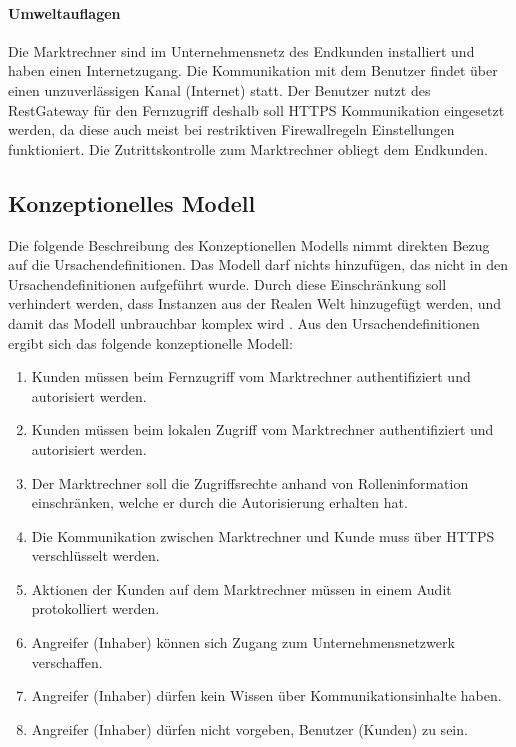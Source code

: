 \documentclass[11pt,a4paper]{report}
\begin{document}
\paragraph{Umweltauflagen} Die Marktrechner sind im Unternehmensnetz des Endkunden installiert und haben einen Internetzugang. Die Kommunikation mit dem Benutzer findet über einen unzuverlässigen Kanal (Internet) statt. Der Benutzer nutzt des RestGateway für den Fernzugriff deshalb soll HTTPS Kommunikation eingesetzt werden, da diese auch meist bei restriktiven Firewallregeln Einstellungen funktioniert. Die Zutrittskontrolle zum Marktrechner obliegt dem Endkunden.

\subsection{Konzeptionelles Modell}

Die folgende Beschreibung des Konzeptionellen Modells nimmt direkten Bezug auf die Ursachendefinitionen. Das Modell darf nichts hinzufügen, das nicht in den Ursachendefinitionen aufgeführt wurde. Durch diese Einschränkung soll verhindert werden, dass Instanzen aus der Realen Welt hinzugefügt werden, und damit das Modell unbrauchbar komplex wird \cite[s.~256]{gutmann}. Aus den Ursachendefinitionen ergibt sich das folgende konzeptionelle Modell:

\begin{enumerate}[leftmargin=*]
\item Kunden müssen beim Fernzugriff vom Marktrechner authentifiziert und autorisiert werden.
\item Kunden müssen beim lokalen Zugriff vom Marktrechner authentifiziert und autorisiert werden.
\item Der Marktrechner soll die Zugriffsrechte anhand von Rolleninformation einschränken, welche er durch die Autorisierung erhalten hat.
\item Die Kommunikation zwischen Marktrechner und Kunde muss über HTTPS verschlüsselt werden.
\item Aktionen der Kunden auf dem Marktrechner müssen in einem Audit protokolliert werden.
\item Angreifer (Inhaber) können sich Zugang zum Unternehmensnetzwerk verschaffen.
\item Angreifer (Inhaber) dürfen kein Wissen über Kommunikationsinhalte haben.
\item Angreifer (Inhaber) dürfen nicht vorgeben, Benutzer (Kunden) zu sein.
\end{enumerate}
\end{document}
